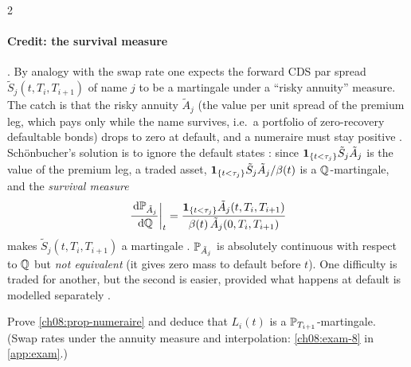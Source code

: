 \begin{paracol}{2}
\paragraph{Credit: the survival measure} . By analogy with the swap rate one expects the forward
CDS par spread $\tilde S_j(t,T_i,T_{i+1})$ of name $j$ to be a martingale under a ``risky annuity'' measure. The
catch is that the risky annuity $\tilde A_j$ (the value per unit spread of the premium leg, which pays only while
the name survives, i.e.\ a portfolio of zero-recovery defaultable bonds) drops to zero at default, and a numeraire
must stay positive . Sch\"onbucher's solution is to ignore the default states
: since $\mathbf{1}_{\{t<\tau_j\}}\tilde S_j\tilde A_j$ is the value of the premium leg, a traded asset,
$\mathbf{1}_{\{t<\tau_j\}}\tilde S_j\tilde A_j/\beta(t)$ is a $\mathbb{Q}$-martingale, and the \emph{survival measure}
\[
  \left.\frac{\,\mathrm{d}\mathbb{P}_{\tilde A_j}}{\,\mathrm{d}\mathbb{Q}}\right|_{t}=\frac{\mathbf{1}_{\{t<\tau_j\}}\tilde A_j(t,T_i,T_{i+1})}{\beta(t)\,\tilde A_j(0,T_i,T_{i+1})}
\]
makes $\tilde S_j(t,T_i,T_{i+1})$ a martingale . $\mathbb{P}_{\tilde A_j}$ is absolutely continuous
with respect to $\mathbb{Q}$ but \emph{not equivalent} (it gives zero mass to default before $t$). One difficulty is traded
for another, but the second is easier, provided what happens at default is modelled separately
.

\begin{exercise}\label{ch08:exam-8-short}
Prove \cref{ch08:prop-numeraire} and deduce that $L_i(t)$ is a $\mathbb{P}_{T_{i+1}}$-martingale. (Swap rates under the annuity measure and interpolation: \cref{ch08:exam-8} in \cref{app:exam}.)
\end{exercise}


\end{paracol}
